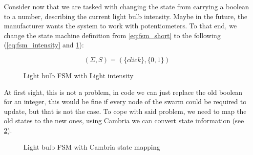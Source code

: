 \documentclass[a4paper]{article}
\begin{document}
Consider now that we are tasked with changing the state from carrying a boolean to a number,
describing the current light bulb intensity.
Maybe in the future, the manufacturer wants the system to work with potentiometers.
To that end, we change the state machine definition from \cref{eq:fsm_short}
to the following (\cref{eq:fsm_intensity} and \cref{fig:bulb_fsm_intensity}):

\begin{equation}
    (\Sigma, S) = (\{click\}, \{0, 1\})
    \label{eq:fsm_intensity}
\end{equation}

\begin{figure}[ht]
    \centering
    \caption{Light bulb FSM with Light intensity}
    \label{fig:bulb_fsm_intensity}
\end{figure}

At first sight, this is not a problem, in code we can just replace the old boolean for an integer,
this would be fine if every node of the swarm could be required to update, but that is not the case.
To cope with said problem, we need to map the old states to the new ones,
using Cambria \cite{Cambria2020} we can convert state information (see \cref{fig:bulb_fsm_state_cambria}).

\begin{figure}[ht]
    \centering
    \caption{Light bulb FSM with Cambria state mapping}
    \label{fig:bulb_fsm_state_cambria}
\end{figure}
\end{document}
